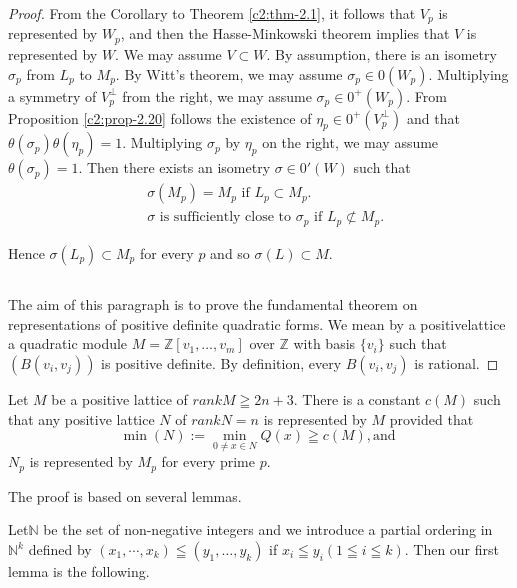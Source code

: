 \begin{proof}
From the Corollary to Theorem \ref{c2:thm-2.1}, it follows that $V_p$ is
represented by $W_p$, and then the Hasse-Minkowski theorem implies
that $V$ is represented by $W$. We may assume $V \subset W$. By
assumption, there is an isometry $\sigma_p$ from $L_p$ to $M_p$. By
Witt's theorem, we may assume $\sigma_p \in
0(W_p)$. Multiplying a symmetry of $V^{\perp}_p$ from the right, we
may assume $\sigma_p \in 0^+(W_p)$. From Proposition \ref{c2:prop-2.20}
follows the existence of $\eta_p \in 0^+(V^{\perp}_p)$ and
that $\theta (\sigma_p)\theta(\eta_p)=1$. Multiplying $\sigma_p$ by
$\eta_p$ on the right, we may assume $\theta (\sigma_p)=1$. Then there
exists an isometry $\sigma \in 0'(W)$ such that 
\begin{align*}
& \sigma (M_p) = M_p \text{ if } L_p \subset M_p.\\
& \sigma \text{ is sufficiently close to } \sigma_p \text{ if }
L_p \not\subset M_p.
\end{align*}

Hence $\sigma(L_p) \subset M_p$ for every $p$ and so $\sigma
(L) \subset M$.

\subsection{}\label{c2:subsec2.4.4} 
The aim of this paragraph is to prove the fundamental theorem on
representations of positive definite quadratic forms. We mean by
a {\rm positive\break lattice} a quadratic module
$M=\mathbb{Z}[v_1, \ldots, v_m]$ over $\mathbb{Z}$ with basis
$\{v_i\}$ such that $(B(v_i,v_j))$ is positive definite. By
definition, every $B(v_i,v_j)$ is rational. 
\end{proof}


\begin{theorem}\label{c2:thm-2.36}
Let $M$ be a positive lattice of $rank M\geqq 2n + 3$. There is a
constant $c(M)$ such that any positive lattice $N$ of $rank N = n$ is
represented by $M$ provided that 
$$
\min(N):= \min\limits_{0\neq x \in N} Q (x) \geqq c(M), \text{
and }
$$
$N_p$ is represented by $M_p$ for every prime $p$. 
\end{theorem}

The proof is based on several lemmas. 

Let\pageoriginale $\mathbb{N}$ be the set of non-negative integers and
we introduce a partial ordering in $\mathbb{N}^k$ defined by
$(x_1,\cdots, x_k)\leqq (y_1, \ldots, y_k)$ if $x_i \leqq y_i (1\leqq
i \leqq k)$. Then our first lemma is the following. 

